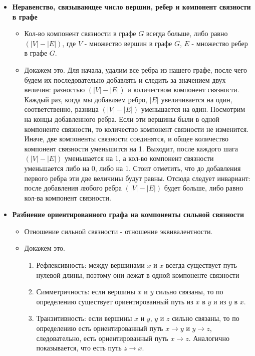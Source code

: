 \begin{itemize}
\begin{itemize}
		\end{itemize}
	
	\item \textbf{Неравенство, связывающее число вершин, ребер и компонент связности в графе}
	
		\begin{itemize}
			\item
			Кол-во компонент связности в графе $G$ всегда больше, либо равно $(|V| - |E|)$, где $V$ - множество вершин в графе $G$, $E$ - множество ребер в графе $G$.
			
			\item
			Докажем это. Для начала, удалим все ребра из нашего графе, после чего будем их последовательно добавлять и следить за значением двух величин: разностью $(|V| - |E|)$ и количеством компонент связности. Каждый раз, когда мы добавляем ребро, $|E|$ увеличивается на один, соответственно, разница $(|V| - |E|)$ уменьшается на один. Посмотрим на концы добавленного ребра. Если эти вершины были в одной компоненте связности, то количество компонент связности не изменится. Иначе, две компоненты связности соединятся, и общее количество компонент связности уменьшится на 1. Выходит, после каждого шага $(|V| - |E|)$ уменьшается на 1, а кол-во компонент связности уменьшается либо на 0, либо на 1. Стоит отметить, что до добавления первого ребра эти две величины будут равны. Отсюда следует инвариант: после добавления любого ребра $(|V| - |E|)$ будет больше, либо равно кол-ва компонент связности.
		\end{itemize}
	
	\item \textbf{Разбиение ориентированного графа на компоненты сильной связности}
	
	\begin{itemize}
	\item
	Отношение сильной связности - отношение эквивалентности.
	
	\item
	Докажем это.
	\begin{enumerate}
	\item Рефлексивность: между вершинами $x$ и $x$ всегда существует путь нулевой длины, поэтому они лежат в одной компоненте связности
	\item Симметричность: если вершины $x$ и $y$ сильно связаны, то по определению существует ориентированный путь из $x$ в $y$ и из $y$ в $x$.
	\item Транзитивность: если вершины $x$ и $y$, $y$ и $z$ сильно связаны, то по определению есть ориентированный путь $x \to y$ и $y \to z$, следовательно, есть ориентированный путь $x \to z$. Аналогично показывается, что есть путь $z \to x$.
	\end{enumerate}
	

\end{itemize}
\end{itemize}
